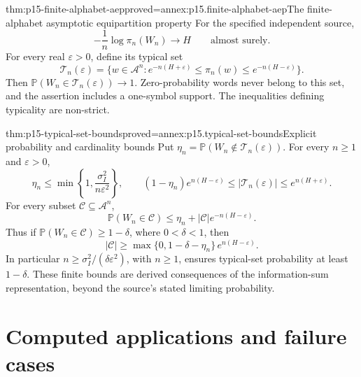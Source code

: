 \begin{hbtheorem}{thm:p15-finite-alphabet-aep}{proved=annex:p15.finite-alphabet-aep}{The finite-alphabet asymptotic equipartition property}
For the specified independent source,
\[
 -\frac1n\log\pi_n(W_n)\longrightarrow H
                                  \qquad\text{almost surely}.
\]
For every real \(\varepsilon>0\), define its typical set
\[
 \mathcal T_n(\varepsilon)=
 \{w\in\mathcal A^n:
 e^{-n(H+\varepsilon)}\leq\pi_n(w)
                  \leq e^{-n(H-\varepsilon)}\}.
\]
Then \(\mathbb P(W_n\in\mathcal T_n(\varepsilon))\to1\).
Zero-probability words never belong to this set, and the assertion
includes a one-symbol support. The inequalities defining typicality
are non-strict.
\end{hbtheorem}

\begin{hbtheorem}{thm:p15-typical-set-bounds}{proved=annex:p15.typical-set-bounds}{Explicit probability and cardinality bounds}
Put \(\eta_n=\mathbb P(W_n\notin\mathcal T_n(\varepsilon))\).
For every \(n\geq1\) and \(\varepsilon>0\),
\[
 \eta_n\leq\min\left\{1,\frac{\sigma_I^2}{n\varepsilon^2}\right\},
 \qquad
 (1-\eta_n)e^{n(H-\varepsilon)}
       \leq|\mathcal T_n(\varepsilon)|\leq e^{n(H+\varepsilon)}.
\]
For every subset \(\mathcal C\subseteq\mathcal A^n\),
\[
 \mathbb P(W_n\in\mathcal C)
       \leq\eta_n+|\mathcal C|e^{-n(H-\varepsilon)}.
\]
Thus if \(\mathbb P(W_n\in\mathcal C)\geq1-\delta\), where
\(0<\delta<1\), then
\[
 |\mathcal C|\geq\max\{0,1-\delta-\eta_n\}\,e^{n(H-\varepsilon)}.
\]
In particular \(n\geq\sigma_I^2/(\delta\varepsilon^2)\), with
\(n\geq1\), ensures typical-set probability at least \(1-\delta\).
These finite bounds are derived consequences of the information-sum
representation, beyond the source's stated limiting probability.
\end{hbtheorem}

\section{Computed applications and failure cases}
\label{sec:p15-strong-law-application-examples}


